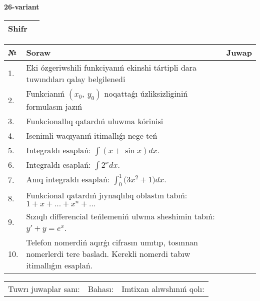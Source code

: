 \documentclass{article}
\begin{document}
  \egroup
  
  \newpage
  
  
  \textbf{26-variant}\\
  
  \bgroup
  \def\arraystretch{1.6} %
  
  \begin{tabular}{|m{5.7cm}|m{9.5cm}|}
  \hline
  Shifr & \\
  \hline
  \end{tabular}
  
  \vspace{1cm}
  
  \begin{tabular}{|m{0.7cm}|m{10cm}|m{4cm}|}
  \hline
  № & Soraw & Juwap \\
  \hline
  1. & Eki ózgeriwshili funkciyanıń ekinshi tártipli dara tuwındıları qalay belgilenedi &  \\
  \hline
  2. & Funkcianıń \((x_{0},\ y_{0})\) noqattaǵı úzliksizliginiń formulasın jazıń &  \\
  \hline
  3. & Funkcionallıq qatardıń uluwma kórinisi &  \\
  \hline
  4. & Isenimli waqıyanıń itimallıǵı nege teń &  \\
  \hline
  5. & Integraldı esaplań: \(\int{(x + \sin x)dx}\). &  \\
  \hline
  6. & Integraldı esaplań: \(\int{2^{x}dx}\). &  \\
  \hline
  7. & Anıq integraldı esaplań: \(\int_{0}^{1}{(3x^2 } + 1)dx\). &  \\
  \hline
  8. & Funkcional qatardıń jıynaqlılıq oblastın tabıń:\(1 + x + ... + x^{n} + ...\) &  \\
  \hline
  9. & Sızıqlı differencial teńlemeniń ulwma sheshimin tabıń: \(y' + y = e^{x}\). &  \\
  \hline
  10. & Telefon nomerdiń aqırǵı cifrasın umıtıp, tosınnan nomerlerdi tere basladı. Kerekli nomerdi tabıw itimallıǵın esaplań. &  \\
  \hline
  \end{tabular}
  
  \vspace{1cm}
  
  \begin{tabular}{lll}
  Tuwrı juwaplar sanı: \underline{\hspace{1.5cm}} & 
  Bahası: \underline{\hspace{1.5cm}} & 
  Imtixan alıwshınıń qolı: \underline{\hspace{2cm}} \\
  \end{tabular}
  
\end{document}
